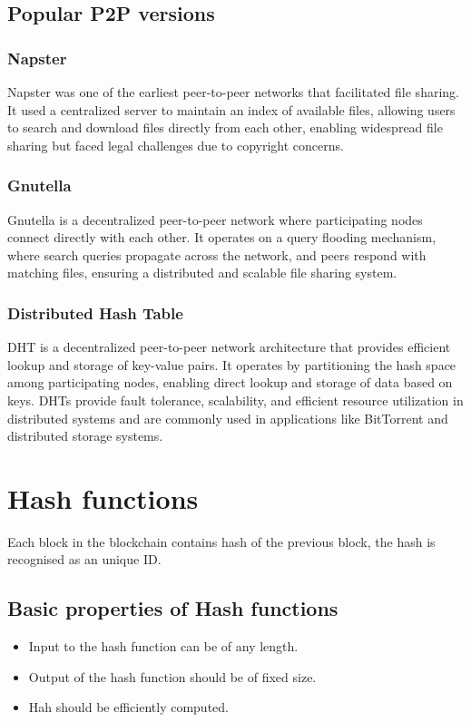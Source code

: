 \documentclass{article}
\begin{document}
\subsection{Popular P2P versions}
\subsubsection{Napster}
Napster was one of the earliest peer-to-peer networks that facilitated file sharing. It used a centralized server to maintain an index of available files, allowing users to search and download files directly from each other, enabling widespread file sharing but faced legal challenges due to copyright concerns.
\subsubsection{Gnutella}
Gnutella is a decentralized peer-to-peer network where participating nodes connect directly with each other. It operates on a query flooding mechanism, where search queries propagate across the network, and peers respond with matching files, ensuring a distributed and scalable file sharing system.
\subsubsection{Distributed Hash Table}
DHT is a decentralized peer-to-peer network architecture that provides efficient lookup and storage of key-value pairs. It operates by partitioning the hash space among participating nodes, enabling direct lookup and storage of data based on keys. DHTs provide fault tolerance, scalability, and efficient resource utilization in distributed systems and are commonly used in applications like BitTorrent and distributed storage systems.
\section{Hash functions}
Each block in the blockchain contains hash of the previous block, the hash is recognised as an unique ID.
\subsection{Basic properties of Hash functions}
\begin{itemize}
    \item Input to the hash function can be of any length.
    \item Output of the hash function should be of fixed size.
    \item Hah should be efficiently computed.
\end{itemize}
\end{document}
